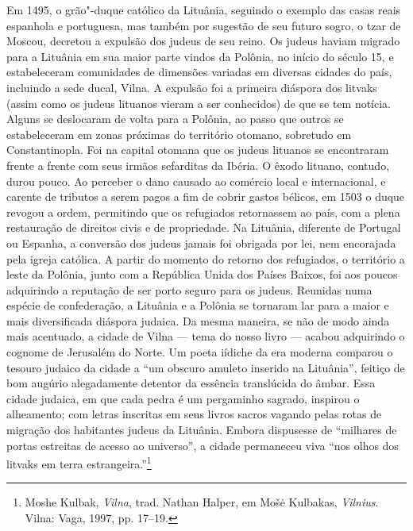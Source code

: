Em 1495, o grão"-duque católico da Lituânia, seguindo o exemplo das casas
reais espanhola e portuguesa, mas também por sugestão de seu futuro
sogro, o tzar de Moscou, decretou a expulsão dos judeus de seu reino. Os
judeus haviam migrado para a Lituânia em sua maior parte vindos da
Polônia, no início do século 15, e estabeleceram comunidades de
dimensões variadas em diversas cidades do país, incluindo a sede ducal,
Vilna. A expulsão foi a primeira diáspora dos litvaks (assim como os
judeus lituanos vieram a ser conhecidos) de que se tem notícia. Alguns
se deslocaram de volta para a Polônia, ao passo que outros se
estabeleceram em zonas próximas do território otomano, sobretudo em
Constantinopla. Foi na capital otomana que os judeus lituanos se
encontraram frente a frente com seus irmãos sefarditas da Ibéria. O
êxodo lituano, contudo, durou pouco. Ao perceber o dano causado ao
comércio local e internacional, e carente de tributos a serem pagos a
fim de cobrir gastos bélicos, em 1503 o duque revogou a ordem,
permitindo que os refugiados retornassem ao país, com a plena
restauração de direitos civis e de propriedade. Na Lituânia, diferente
de Portugal ou Espanha, a conversão dos judeus jamais foi obrigada por
lei, nem encorajada pela igreja católica. A partir do momento do retorno
dos refugiados, o território a leste da Polônia, junto com a República
Unida dos Países Baixos, foi aos poucos adquirindo a reputação de ser
porto seguro para os judeus. Reunidas numa espécie de confederação, a
Lituânia e a Polônia se tornaram lar para a maior e mais diversificada
diáspora judaica. Da mesma maneira, se não de modo ainda mais acentuado,
a cidade de Vilna --- tema do nosso livro --- acabou adquirindo o cognome de
Jerusalém do Norte. Um poeta iídiche da era moderna comparou o tesouro
judaico da cidade a ``um obscuro amuleto inserido na Lituânia'', feitiço
de bom augúrio alegadamente detentor da essência translúcida do âmbar.
Essa cidade judaica, em que cada pedra é um pergaminho sagrado, inspirou
o alheamento; com letras inscritas em seus livros sacros vagando pelas
rotas de migração dos habitantes judeus da Lituânia. Embora dispusesse
de ``milhares de portas estreitas de acesso ao universo'', a cidade
permaneceu viva ``nos olhos dos litvaks em terra
estrangeira.''\footnote{Moshe Kulbak, \textit{Vilna}, trad. Nathan
  Halper, em Mošė Kulbakas, \textit{Vilnius}. Vilna: Vaga, 1997, pp.
  17--19.}

